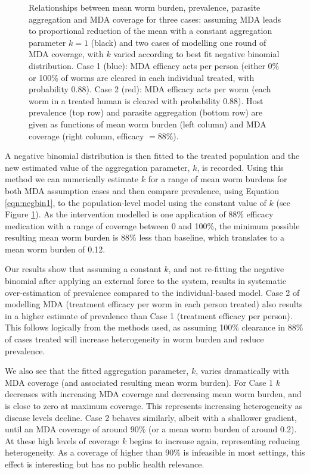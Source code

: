 \begin{figure}[h]
\begin{center}
\caption{Relationships between mean worm burden, prevalence, parasite aggregation and MDA coverage for three cases: assuming MDA leads to proportional reduction of the mean with a constant aggregation parameter $k=1$ (black) and two cases of modelling one round of MDA coverage, with $k$ varied according to best fit negative binomial distribution. Case 1 (blue): MDA efficacy acts per person (either 0\% or 100\% of worms are cleared in each individual treated, with probability 0.88). Case 2 (red): MDA efficacy acts per worm (each worm in a treated human is cleared with probability 0.88). Host prevalence (top row) and parasite aggregation (bottom row) are given as functions of mean worm burden (left column) and MDA coverage (right column, efficacy $=88$\%).}
\label{fig:k}
\end{center}
\end{figure}

A negative binomial distribution is then fitted to the treated population and the new estimated value of the aggregation parameter, $k$, is recorded. Using this method we can numerically estimate $k$ for a range of mean worm burdens for both MDA assumption cases and then compare prevalence, using Equation \ref{eqn:negbin1}, to the population-level model using the constant value of $k$ (see Figure \ref{fig:k}). As the intervention modelled is one application of 88\% efficacy medication with a range of coverage between 0 and 100\%, the minimum possible resulting mean worm burden is 88\% less than baseline, which translates to a mean worm burden of 0.12.  

Our results show that assuming a constant $k$, and not re-fitting the negative binomial after applying an external force to the system, results in systematic over-estimation of prevalence compared to the individual-based model. Case 2 of modelling MDA (treatment efficacy per worm in each person treated) also results in a higher estimate of prevalence than Case 1 (treatment efficacy per person). This follows logically from the methods used, as assuming 100\% clearance in 88\% of cases treated will increase heterogeneity in worm burden and reduce prevalence.

We also see that the fitted aggregation parameter, $k$, varies dramatically with MDA coverage (and associated resulting mean worm burden). For Case 1 $k$ decreases with increasing MDA coverage and decreasing mean worm burden, and is close to zero at maximum coverage. This represents increasing heterogeneity as disease levels decline. Case 2 behaves similarly, albeit with a shallower gradient, until an MDA coverage of around 90\% (or a mean worm burden of around 0.2). At these high levels of coverage $k$ begins to increase again, representing reducing heterogeneity. As a coverage of higher than 90\% is infeasible in most settings, this effect is interesting but has no public health relevance.


